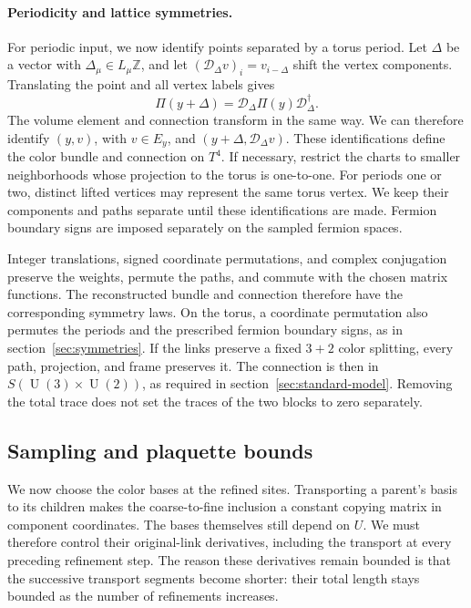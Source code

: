 \documentclass[11pt,a4paper]{article}
\theoremstyle{remark}
\DeclareMathOperator{\U}{U}
\begin{document}
\paragraph{Periodicity and lattice symmetries.}
For periodic input, we now identify points separated by a torus period.
Let $\Delta$ be a vector with $\Delta_\mu\in L_\mu\mathbb Z$, and
let $(\mathcal D_\Delta v)_i=v_{i-\Delta}$ shift the vertex components.
Translating the point and all vertex labels gives
\begin{equation}
 \Pi(y+\Delta)=\mathcal D_\Delta\Pi(y)\mathcal D_\Delta^{\dagger} .
\end{equation}
The volume element and connection transform in the same way. We can
therefore identify $(y,v)$, with $v\in E_y$, and
$(y+\Delta,\mathcal D_\Delta v)$. These identifications define the
color bundle and connection on $T^4$. If necessary, restrict the charts
to smaller neighborhoods whose projection to the torus is one-to-one.
For periods one or two, distinct lifted vertices may represent the same
torus vertex. We keep their components and paths separate until these
identifications are made. Fermion boundary signs are imposed separately
on the sampled fermion spaces.

Integer translations, signed coordinate permutations, and complex
conjugation preserve the weights, permute the paths, and commute with
the chosen matrix functions. The reconstructed bundle and connection
therefore have the corresponding symmetry laws. On the torus, a coordinate
permutation also permutes the periods and the prescribed fermion boundary
signs, as in section~\ref{sec:symmetries}. If the links preserve
a fixed $3+2$ color splitting, every path, projection, and frame preserves
it. The connection is then in $S(\U(3)\times\U(2))$, as required
in section~\ref{sec:standard-model}. Removing the total trace does
not set the traces of the two blocks to zero separately.

\subsection{Sampling and plaquette bounds}
\label{app:g:sampling}
\label{app:g:comparison}

We now choose the color bases at the refined sites. Transporting a
parent's basis to its children makes the coarse-to-fine inclusion a
constant copying matrix in component coordinates. The bases themselves
still depend on $U$. We must therefore control their original-link
derivatives, including the transport at every preceding refinement step.
The reason these derivatives remain bounded is that the successive
transport segments become shorter: their total length stays bounded as
the number of refinements increases.
\end{document}
